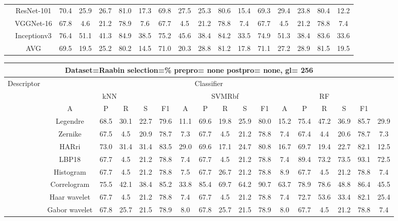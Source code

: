 \documentclass[12pt,italian]{article}
\begin{document}
\begin{tiny}
\begin{longtable}{lcccccccccccccccc}
& ResNet-101 & 70.4 & 25.9 & 26.7 & 81.0 & 17.3 & 69.8 & 27.5 & 25.3 & 80.6 & 15.4 & 69.3 & 29.4 & 23.8 & 80.4 & 12.2 \\ 
& VGGNet-16 & 67.8 &  4.6 & 21.2 & 78.9 &  7.6 & 67.7 &  4.5 & 21.2 & 78.8 &  7.4 & 67.7 &  4.5 & 21.2 & 78.8 &  7.4 \\ 
& Inceptionv3 & 76.4 & 51.1 & 41.3 & 84.9 & 38.5 & 75.2 & 45.6 & 38.4 & 84.2 & 33.5 & 74.9 & 51.3 & 38.4 & 83.6 & 33.6 \\ 
\hline
& AVG & 69.5 & 19.5 & 25.2 & 80.2 & 14.5 & 71.0 & 20.3 & 28.8 & 81.2 & 17.8 & 71.1 & 27.2 & 28.9 & 81.5 & 19.5 \\ 
\hline
\bottomrule
\end{longtable} 

 \pagebreak 
\begin{longtable}{lcccccccccccccccc}
\toprule
\multicolumn{16}{c}{Dataset=Raabin selection=\% prepro= none postpro= none, gl= 256} \\ 
\toprule
Descriptor & \multicolumn{15}{c}{Classifier} \\ 
& \multicolumn{5}{c}{kNN} & \multicolumn{5}{c}{SVMRbf} & \multicolumn{5}{c}{RF} \\ 
& A & P & R & S & F1 & A & P & R & S & F1 & A & P & R & S & F1 \\ 
\midrule
& Legendre & 68.5 & 30.1 & 22.7 & 79.6 & 11.1 & 69.6 & 19.8 & 25.9 & 80.0 & 15.2 & 75.4 & 47.2 & 36.9 & 85.7 & 29.9 \\ 
& Zernike & 67.5 &  4.5 & 20.9 & 78.7 &  7.3 & 67.7 &  4.5 & 21.2 & 78.8 &  7.4 & 67.4 &  4.4 & 20.6 & 78.7 &  7.3 \\ 
& HARri & 73.0 & 31.4 & 31.4 & 83.5 & 29.0 & 69.6 & 17.1 & 24.7 & 80.8 & 16.7 & 69.7 & 19.4 & 22.7 & 82.1 & 12.5 \\ 
& LBP18 & 67.7 &  4.5 & 21.2 & 78.8 &  7.4 & 67.7 &  4.5 & 21.2 & 78.8 &  7.4 & 89.4 & 73.2 & 73.5 & 93.1 & 72.5 \\ 
& Histogram & 67.7 &  4.5 & 21.2 & 78.8 &  7.5 & 67.7 & 26.7 & 21.2 & 78.8 &  8.9 & 67.7 &  4.5 & 21.2 & 78.8 &  7.4 \\ 
& Correlogram & 75.5 & 42.1 & 38.4 & 85.2 & 33.8 & 85.4 & 69.7 & 64.2 & 90.7 & 63.7 & 78.9 & 78.6 & 48.8 & 86.4 & 45.5 \\ 
& Haar wavelet & 67.7 &  4.5 & 21.2 & 78.8 &  7.4 & 67.7 &  4.5 & 21.2 & 78.8 &  7.4 & 72.7 & 53.6 & 33.4 & 82.1 & 25.4 \\ 
& Gabor wavelet & 67.8 & 25.7 & 21.5 & 78.9 &  8.0 & 67.8 & 25.7 & 21.5 & 78.9 &  8.0 & 67.7 &  4.5 & 21.2 & 78.8 &  7.4 \\ 

\end{longtable}
\end{tiny}
\end{document}

